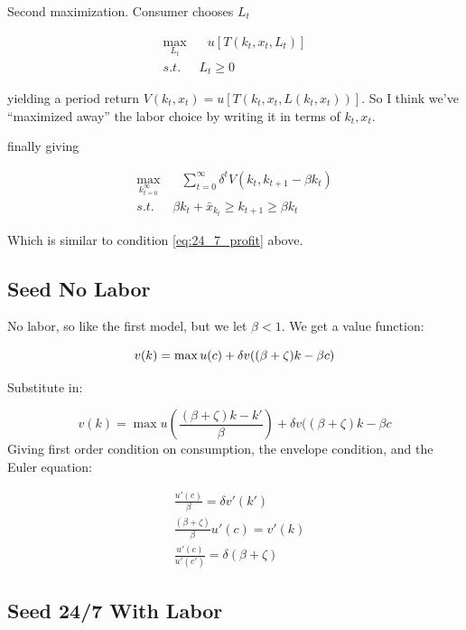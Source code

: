 \documentclass[11pt]{article}
\begin{document}
  Second maximization.  Consumer chooses $L_t$

  \begin{align}
    \max_{L_t} & \ \ \  u[T(k_t, x_t, L_t)] \\
    s.t. \ \ \ & L_t \geq 0
  \end{align}

  yielding a period return $V(k_t, x_t) = u[T(k_t, x_t, L(k_t, x_t))]$.  So I think we've ``maximized away'' the labor choice by writing it in terms of $k_t, x_t$.

  finally giving

  \begin{align}
    \max_{k_{t=0}^\infty} & \ \ \ \sum_{t=0}^{\infty} \delta^t V(k_t, k_{t+1} - \beta k_t)\\
    s.t. \ \ \ & \beta k_t + \bar{x}_{k_t} \geq k_{t+1} \geq \beta k_t
  \end{align}

  Which is similar to condition \ref{eq:24_7_profit} above.
  
  
\subsection{Seed No Labor}
\label{sub:seed_no_labor}
  
  No labor, so like the first model, but we let $\beta < 1$. We get a value function:

  \begin{equation} \label{eq:no_labor_vf}
    v(k) = \max u(c) + \delta v((\beta + \zeta)k - \beta c)\\
  \end{equation}
  
  Substitute in:

  \begin{equation}
      v(k) = \max u(\frac{(\beta + \zeta)k - k'}{\beta}) + \delta v((\beta + \zeta)k - \beta c  
  \end{equation}  
  Giving first order condition on consumption, the envelope condition, and the Euler equation:

  \begin{align}
    &\frac{u'(c)}{\beta} = \delta v'(k') \label{no_labor_foc}\\
    &\frac{(\beta + \zeta)}{\beta} u'(c) = v'(k) \label{no_labor_ec} \\
    &\frac{u'(c)}{u'(c')} = \delta(\beta + \zeta) \label{no_labor_ee}
  \end{align}

\subsection{Seed 24/7 With Labor}
\label{sub:seed_24_7_with_labor}
\end{document}
